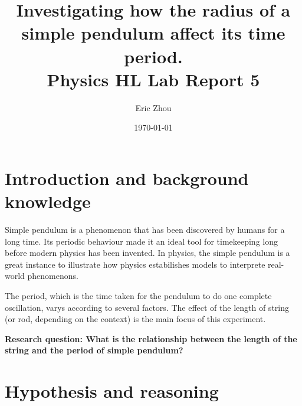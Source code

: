 \documentclass[a4paper]{article}
\begin{document}
\begin{titlepage}
    \title{\textbf{Investigating how the radius of a simple pendulum affect its time period. \\ \small Physics HL Lab Report 5}}
    \author{Eric Zhou}
    \date{\today}
    \maketitle
\end{titlepage}

\section{Introduction and background knowledge}

Simple pendulum is a phenomenon that has been discovered by humans for a long time. Its periodic behaviour made it an ideal tool for timekeeping long before modern physics has been invented. In physics, the simple pendulum is a great instance to illustrate how physics estabilishes models to interprete real-world phenomenons. 

The period, which is the time taken for the pendulum to do one complete oscillation, varys according to several factors. The effect of the length of string (or rod, depending on the context) is the main focus of this experiment.

\textbf{Research question: What is the relationship between the length of the string and the period of simple pendulum?}
\section{Hypothesis and reasoning}
\end{document}
